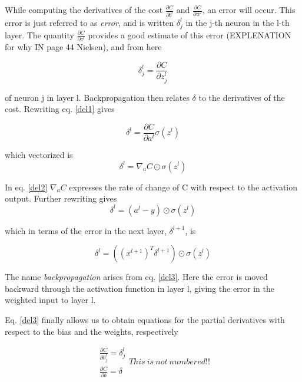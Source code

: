 \documentclass[a4paper,11pt,twocolumn]{article}
\begin{document}
While computing the  derivatives of the cost $\frac{\partial C}{\partial b^l}$ and $\frac{\partial C}{\partial w^l}$, an error will occur. This error is just referred to as \textit{error}, and is written $\delta_j^l$ in the j-th neuron in the l-th layer. The quantity $\frac{\partial C}{\partial z^l}$ provides a good estimate of this error (EXPLENATION for why IN page 44 Nielsen), and from here 

\begin{equation}
\delta_j^l = \frac{\partial C}{\partial z_j^l}
\label{del1}
\end{equation}

of neuron j in layer l. Backpropagation then relates $\delta$ to the derivatives of the cost. Rewriting eq. \eqref{del1} gives

\begin{equation}
\delta^l = \frac{\partial C}{\partial a^l} \sigma(z^l)
\label{del2}
\end{equation}

which vectorized is 
\begin{equation}
\delta^l = \nabla_aC \odot\sigma(z^l)
\label{del2}
\end{equation}

In eq. \eqref{del2} $\nabla_aC$ expresses the rate of change of C with respect to the activation output. Further rewriting gives 
\begin{equation}
\delta^l = (a^l - y)\odot \sigma(z^l)
\end{equation}

which in terms of the error in the next layer, $\delta^{l+1}$, is

\begin{equation}
\delta^l = ((x^{l+1})^T\delta^{l+1})\odot \sigma(z^l)
\label{del3}
\end{equation}

The name \textit{backpropagation} arises from eq. \eqref{del3}.  Here the error is moved backward through the activation function in layer l, giving the error in the weighted input to layer l. 

Eq. \eqref{del3} finally allows us to obtain equations for the partial derivatives with respect to the bias and the weights, respectively

\begin{equation*}
\begin{aligned}
\frac{\partial C}{\partial b_j^l} = \delta_j^l \\
\frac{\partial C}{\partial b} = \delta
\end{aligned}
This \ is \ not \ numbered!!
\end{equation*}
\end{document}
